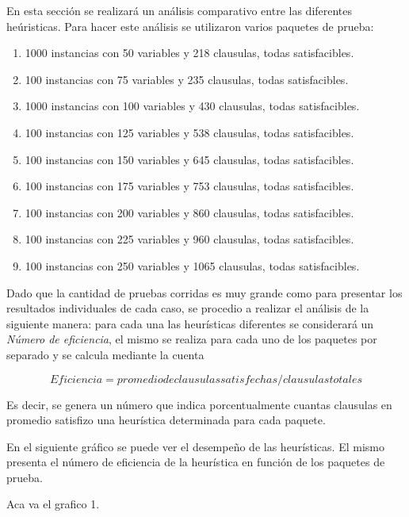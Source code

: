 \documentclass[a4paper,10pt]{article}
\begin{document}
En esta secci\'on se realizar\'a un an\'alisis comparativo entre las diferentes he\'uristicas. Para hacer este an\'alisis se utilizaron varios paquetes de prueba:

\begin{enumerate}
\item 1000 instancias con 50 variables y 218 clausulas, todas satisfacibles.
\item 100 instancias con 75 variables y 235 clausulas, todas satisfacibles.
\item 1000 instancias con 100 variables y 430 clausulas, todas satisfacibles.
\item 100 instancias con 125 variables y 538 clausulas, todas satisfacibles.
\item 100 instancias con 150 variables y 645 clausulas, todas satisfacibles.
\item 100 instancias con 175 variables y 753 clausulas, todas satisfacibles.
\item 100 instancias con 200 variables y 860 clausulas, todas satisfacibles.
\item 100 instancias con 225 variables y 960 clausulas, todas satisfacibles.
\item 100 instancias con 250 variables y 1065 clausulas, todas satisfacibles.
\end{enumerate}

Dado que la cantidad de pruebas corridas es muy grande como para presentar los resultados individuales de cada caso, se procedio a realizar el an\'alisis de la siguiente manera: para cada una las heur\'isticas diferentes se considerar\'a un \emph{N\'umero de eficiencia}, el mismo se realiza para cada uno de los paquetes por separado y se calcula mediante la cuenta 

\begin{equation}
 Eficiencia = promedio de clausulas satisfechas/clausulas totales
\end{equation}

Es decir, se genera un n\'umero que indica porcentualmente cuantas clausulas en promedio satisfizo una heur\'istica determinada para cada paquete.

En el siguiente gr\'afico se puede ver el desempe\~{n}o de las heur\'isticas. El mismo presenta el n\'umero de eficiencia de la heur\'istica en funci\'on de los paquetes de prueba.


Aca va el grafico 1.
\end{document}
